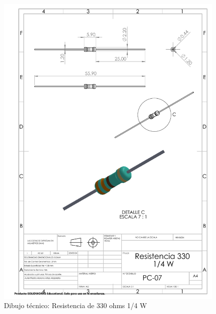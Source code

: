     \begin{figure}[H]
        \centering
        \includegraphics[trim = {7mm 1mm 1mm 1mm},clip,scale=0.4]{22/Img/resistenciaDibujo.PDF}
        \caption{Dibujo técnico: Resistencia de 330 ohms 1/4 W}
        \label{fig:enter-label7}
    \end{figure}
    
    
